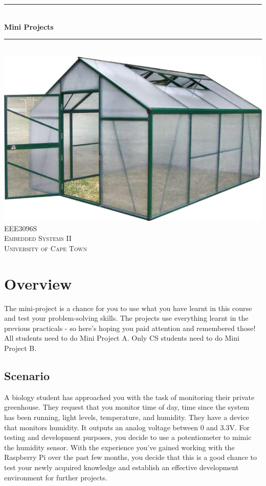 \newpage
\begin{center}
    \rule{\linewidth}{0.2 mm} \\[0.4 cm]
	{ \huge \bfseries Mini Projects}\\
	\rule{\linewidth}{0.2 mm} \\[1.5 cm]
	\includegraphics[scale = 0.5]{Figures/Greenhouse.jpg}\\[1 cm]
	\textsc{\Large EEE3096S}\\[0.5 cm]
	\textsc{\large Embedded Systems II}\\[0.5 cm]
	\textsc{\LARGE University of Cape Town}\\[0.5 cm]
\end{center}

\section{Overview}
The mini-project is a chance for you to use what you have learnt in this course and test your problem-solving skills. The projects use everything learnt in the previous practicals - so here's hoping you paid attention and remembered those! All students need to do Mini Project A. Only CS students need to do Mini Project B.

\subsection{Scenario}
A biology student has approached you with the task of monitoring their private greenhouse. They request that you monitor time of day, time since the system has been running, light levels, temperature, and humidity. They have a device that monitors humidity. It outputs an analog voltage between 0 and 3.3V. For testing and development purposes, you decide to use a potentiometer to mimic the humidity sensor. With the experience you've gained working with the Raspberry Pi over the past few months, you decide that this is a good chance to test your newly acquired knowledge and establish an effective development environment for further projects.

